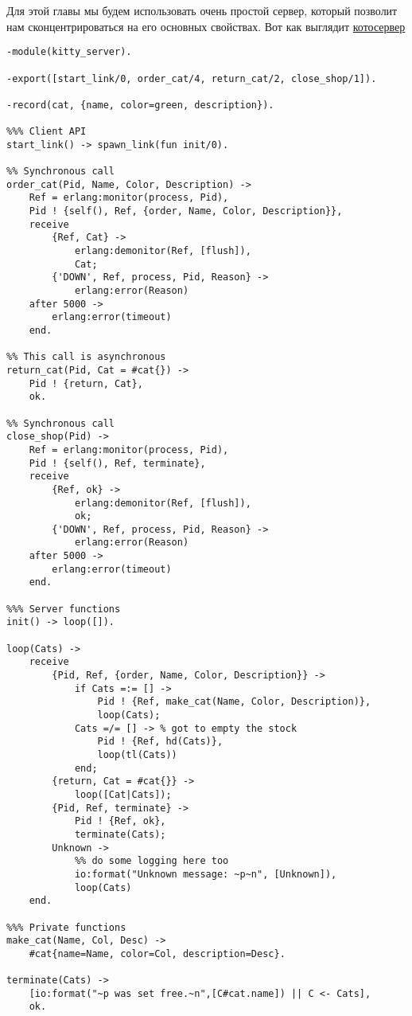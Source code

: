 Для этой главы мы будем использовать очень простой сервер, который позволит нам сконцентрироваться на его основных свойствах.
Вот как выглядит \href{http://learnyousomeerlang.com/static/erlang/kitty\_server.erl}{котосервер}
\begin{lstlisting}[style=erlang]
%%%%% Naive version
-module(kitty_server).
 
-export([start_link/0, order_cat/4, return_cat/2, close_shop/1]).
 
-record(cat, {name, color=green, description}).
 
%%% Client API
start_link() -> spawn_link(fun init/0).
 
%% Synchronous call
order_cat(Pid, Name, Color, Description) ->
    Ref = erlang:monitor(process, Pid),
    Pid ! {self(), Ref, {order, Name, Color, Description}},
    receive
        {Ref, Cat} ->
            erlang:demonitor(Ref, [flush]),
            Cat;
        {'DOWN', Ref, process, Pid, Reason} ->
            erlang:error(Reason)
    after 5000 ->
        erlang:error(timeout)
    end.
 
%% This call is asynchronous
return_cat(Pid, Cat = #cat{}) ->
    Pid ! {return, Cat},
    ok.
 
%% Synchronous call
close_shop(Pid) ->
    Ref = erlang:monitor(process, Pid),
    Pid ! {self(), Ref, terminate},
    receive
        {Ref, ok} ->
            erlang:demonitor(Ref, [flush]),
            ok;
        {'DOWN', Ref, process, Pid, Reason} ->
            erlang:error(Reason)
    after 5000 ->
        erlang:error(timeout)
    end.
 
%%% Server functions
init() -> loop([]).
 
loop(Cats) ->
    receive
        {Pid, Ref, {order, Name, Color, Description}} ->
            if Cats =:= [] ->
                Pid ! {Ref, make_cat(Name, Color, Description)},
                loop(Cats);
            Cats =/= [] -> % got to empty the stock
                Pid ! {Ref, hd(Cats)},
                loop(tl(Cats))
            end;
        {return, Cat = #cat{}} ->
            loop([Cat|Cats]);
        {Pid, Ref, terminate} ->
            Pid ! {Ref, ok},
            terminate(Cats);
        Unknown ->
            %% do some logging here too
            io:format("Unknown message: ~p~n", [Unknown]),
            loop(Cats)
    end.
 
%%% Private functions
make_cat(Name, Col, Desc) ->
    #cat{name=Name, color=Col, description=Desc}.
 
terminate(Cats) ->
    [io:format("~p was set free.~n",[C#cat.name]) || C <- Cats],
    ok.
\end{lstlisting}

